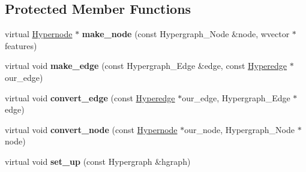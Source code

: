 \subsection*{Protected Member Functions}
\begin{DoxyCompactItemize}
\item 
\hypertarget{class_scarab_1_1_h_g_1_1_hypergraph_impl_af14198ba5fccb5d4118188fa42feb8ff}{
virtual \hyperlink{class_scarab_1_1_h_g_1_1_hypernode}{Hypernode} $\ast$ {\bfseries make\_\-node} (const Hypergraph\_\-Node \&node, wvector $\ast$features)}
\label{class_scarab_1_1_h_g_1_1_hypergraph_impl_af14198ba5fccb5d4118188fa42feb8ff}

\item 
\hypertarget{class_scarab_1_1_h_g_1_1_hypergraph_impl_a238a7ce3b578c8126eccbc7803570638}{
virtual void {\bfseries make\_\-edge} (const Hypergraph\_\-Edge \&edge, const \hyperlink{class_scarab_1_1_h_g_1_1_hyperedge}{Hyperedge} $\ast$our\_\-edge)}
\label{class_scarab_1_1_h_g_1_1_hypergraph_impl_a238a7ce3b578c8126eccbc7803570638}

\item 
\hypertarget{class_scarab_1_1_h_g_1_1_hypergraph_impl_a30349aca0e3b8f8dc72ed74d78e8c5b8}{
virtual void {\bfseries convert\_\-edge} (const \hyperlink{class_scarab_1_1_h_g_1_1_hyperedge}{Hyperedge} $\ast$our\_\-edge, Hypergraph\_\-Edge $\ast$edge)}
\label{class_scarab_1_1_h_g_1_1_hypergraph_impl_a30349aca0e3b8f8dc72ed74d78e8c5b8}

\item 
\hypertarget{class_scarab_1_1_h_g_1_1_hypergraph_impl_a93e9e250fa457a2171bf07241b7829eb}{
virtual void {\bfseries convert\_\-node} (const \hyperlink{class_scarab_1_1_h_g_1_1_hypernode}{Hypernode} $\ast$our\_\-node, Hypergraph\_\-Node $\ast$node)}
\label{class_scarab_1_1_h_g_1_1_hypergraph_impl_a93e9e250fa457a2171bf07241b7829eb}

\item 
\hypertarget{class_scarab_1_1_h_g_1_1_hypergraph_impl_ae91de73e633e450b01664e3ec964019c}{
virtual void {\bfseries set\_\-up} (const Hypergraph \&hgraph)}
\label{class_scarab_1_1_h_g_1_1_hypergraph_impl_ae91de73e633e450b01664e3ec964019c}

\end{DoxyCompactItemize}
